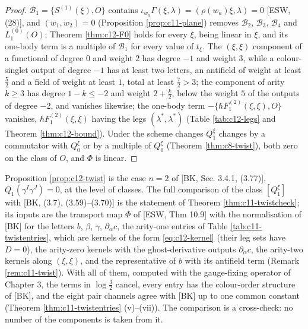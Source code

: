 \begin{proof}
$\mathcal B_1=\{S^{(1)}(\xi),O\}$ contains $\iota_{w_a}\Gamma(\xi,\lambda)=(\rho(w_a)\xi,\lambda)=0$ [ESW, (28)], and $(w_1,w_2)=0$ (Proposition \ref{prop:c11-plane}) removes $\mathcal B_2$, $\mathcal B_3$, $\mathcal B_4$ and $L_1^{(0)}(O)$; Theorem \ref{thm:c12-F0} holds for every $\xi$, being linear in $\xi$, and its one-body term is a multiple of $\mathcal B_1$ for every value of $t_\xi$. The $(\xi,\xi)$ component of a functional of degree $0$ and weight $2$ has degree $-1$ and weight $3$, while a colour-singlet output of degree $-1$ has at least two letters, an antifield of weight at least $\tfrac52$ and a field of weight at least $1$, total at least $\tfrac72>3$; the component of arity $k\ge3$ has degree $1-k\le-2$ and weight $2+\tfrac k2$, below the weight $5$ of the outputs of degree $-2$, and vanishes likewise; the one-body term $-\{\hbar F_1^{(2)}(\xi,\xi),O\}$ vanishes, $\hbar F_1^{(2)}(\xi,\xi)$ having the legs $(\lambda^*,\lambda^*)$ (Table \ref{tab:c12-legs} and Theorem \ref{thm:c12-bound}). Under the scheme changes $Q^\xi_1$ changes by a commutator with $Q^\xi_0$ or by a multiple of $Q^\xi_0$ (Theorem \ref{thm:c8-twist}), both zero on the class of $O$, and $\Phi$ is linear.
\end{proof}

\begin{remark}
\label{rem:c12-twistcmp}
Proposition \ref{prop:c12-twist} is the case $n=2$ of [BK, Sec. 3.4.1, (3.77)], $Q_1(\gamma^I\gamma^J)=0$, at the level of classes. The full comparison of the class $[Q^\xi_1]$ with [BK, (3.7), (3.59)--(3.70)] is the statement of Theorem \ref{thm:c11-twistcheck}; its inputs are the transport map $\Phi$ of [ESW, Thm 10.9] with the normalisation of [BK] for the letters $b$, $\beta$, $\gamma$, $\partial_{\dot\alpha}c$, the arity-one entries of Table \ref{tab:c11-twistentries}, which are kernels of the form \eqref{eq:c12-kernel} (their leg sets have $D=0$), the arity-zero kernels with the ghost-derivative outputs $\partial_{\dot\alpha}c$, the arity-two kernels along $(\xi,\xi)$, and the representative of $b$ with its antifield term (Remark \ref{rem:c11-twist}). With all of them, computed with the gauge-fixing operator of Chapter 3, the terms in $\log\tfrac32$ cancel, every entry has the colour-order structure of [BK], and the eight pair channels agree with [BK] up to one common constant (Theorem \ref{thm:c11-twistentries} (v)--(vii)). The comparison is a cross-check: no number of the components is taken from it.
\end{remark}

